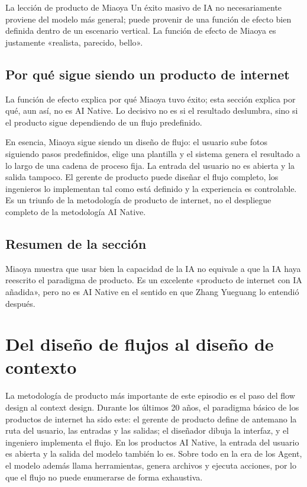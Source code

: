 \documentclass[a4paper]{article}
\begin{document}
\begin{importantbox}{La lección de producto de Miaoya}
Un éxito masivo de IA no necesariamente proviene del modelo más general; puede provenir de una función de efecto bien definida dentro de un escenario vertical. La función de efecto de Miaoya es justamente «realista, parecido, bello».
\end{importantbox}

\subsection{Por qué sigue siendo un producto de internet}

La función de efecto explica por qué Miaoya tuvo éxito; esta sección explica por qué, aun así, no es AI Native. Lo decisivo no es si el resultado deslumbra, sino si el producto sigue dependiendo de un flujo predefinido.

En esencia, Miaoya sigue siendo un diseño de flujo: el usuario sube fotos siguiendo pasos predefinidos, elige una plantilla y el sistema genera el resultado a lo largo de una cadena de proceso fija. La entrada del usuario no es abierta y la salida tampoco. El gerente de producto puede diseñar el flujo completo, los ingenieros lo implementan tal como está definido y la experiencia es controlable. Es un triunfo de la metodología de producto de internet, no el despliegue completo de la metodología AI Native.

\subsection{Resumen de la sección}

Miaoya muestra que usar bien la capacidad de la IA no equivale a que la IA haya reescrito el paradigma de producto. Es un excelente «producto de internet con IA añadida», pero no es AI Native en el sentido en que Zhang Yueguang lo entendió después.
\section{Del diseño de flujos al diseño de contexto}

La metodología de producto más importante de este episodio es el paso del flow design al context design. Durante los últimos 20 años, el paradigma básico de los productos de internet ha sido este: el gerente de producto define de antemano la ruta del usuario, las entradas y las salidas; el diseñador dibuja la interfaz, y el ingeniero implementa el flujo. En los productos AI Native, la entrada del usuario es abierta y la salida del modelo también lo es. Sobre todo en la era de los Agent, el modelo además llama herramientas, genera archivos y ejecuta acciones, por lo que el flujo no puede enumerarse de forma exhaustiva.
\end{document}
